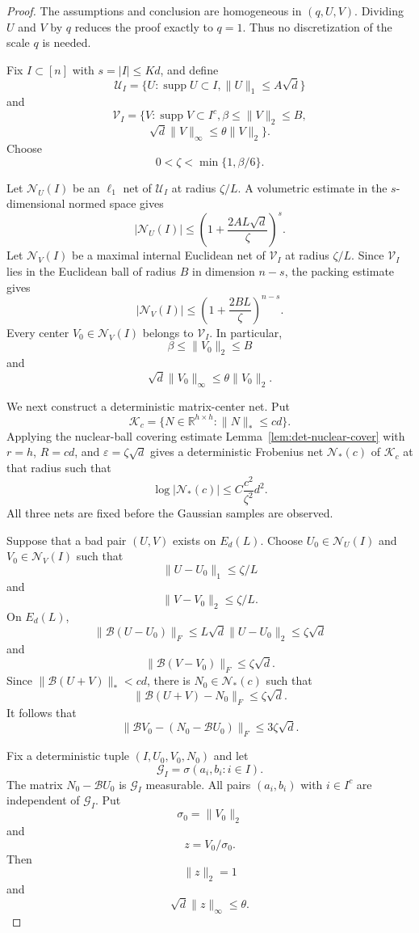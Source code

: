 \documentclass[11pt]{article}
\numberwithin{equation}{section}
\theoremstyle{definition}
\theoremstyle{remark}
\newcommand{\R}{\mathbb R}
\newcommand{\1}{\boldsymbol 1}
\newcommand{\cB}{\mathcal B}
\newcommand{\supp}{\operatorname{supp}}
\begin{document}
\begin{aiblock}
\begin{proof}
  The assumptions and conclusion are homogeneous in
  $(q,U,V)$. Dividing $U$ and $V$ by $q$ reduces the
  proof exactly to $q=1$. Thus no discretization of the
  scale $q$ is needed.

  Fix $I\subset[n]$ with $s=|I|\le Kd$, and define
  \[
    \mathcal U_I=\{U:\supp U\subset I,\|U\|_1\le
    A\sqrt d\}
  \]
  and
  \[
    \mathcal V_I=\{V:\supp V\subset I^c,\beta\le
    \|V\|_2\le B,
  \]
  \[
    \sqrt d\|V\|_\infty\le\theta\|V\|_2\}.
  \]
  Choose
  \[
    0<\zeta<\min\{1,\beta/6\}.
  \]

  Let $\mathcal N_U(I)$ be an $\ell_1$ net of
  $\mathcal U_I$ at radius $\zeta/L$. A volumetric
  estimate in the $s$-dimensional normed space gives
  \[
    |\mathcal N_U(I)| \le
    \left(1+\frac{2AL\sqrt d}{\zeta}\right)^s.
  \]
  Let $\mathcal N_V(I)$ be a maximal internal Euclidean
  net of $\mathcal V_I$ at radius $\zeta/L$. Since
  $\mathcal V_I$ lies in the Euclidean ball of radius
  $B$ in dimension $n-s$, the packing estimate gives
  \[
    |\mathcal N_V(I)| \le
    \left(1+\frac{2BL}{\zeta}\right)^{n-s}.
  \]
  Every center $V_0\in\mathcal N_V(I)$ belongs to
  $\mathcal V_I$. In particular,
  \[
    \beta\le\|V_0\|_2\le B
  \]
  and
  \[
    \sqrt d\|V_0\|_\infty\le\theta\|V_0\|_2.
  \]

  We next construct a deterministic matrix-center net.
  Put
  \[
    \mathcal K_c=\{N\in\R^{h\times h}:\|N\|_*\le cd\}.
  \]
  Applying the nuclear-ball covering estimate
  Lemma~\ref{lem:det-nuclear-cover} with $r=h$, $R=cd$, and
  $\varepsilon=\zeta\sqrt d$ gives a deterministic
  Frobenius net $\mathcal N_*(c)$ of $\mathcal K_c$ at
  that radius such that
  \[
    \log|\mathcal N_*(c)| \le
    C\frac{c^2}{\zeta^2}d^2.
  \]
  All three nets are fixed before the Gaussian samples
  are observed.

  Suppose that a bad pair $(U,V)$ exists on $E_d(L)$.
  Choose $U_0\in\mathcal N_U(I)$ and
  $V_0\in\mathcal N_V(I)$ such that
  \[
    \|U-U_0\|_1\le\zeta/L
  \]
  and
  \[
    \|V-V_0\|_2\le\zeta/L.
  \]
  On $E_d(L)$,
  \[
    \|\cB(U-U_0)\|_F \le L\sqrt d\|U-U_0\|_2
    \le\zeta\sqrt d
  \]
  and
  \[
    \|\cB(V-V_0)\|_F\le\zeta\sqrt d.
  \]
  Since $\|\cB(U+V)\|_*<cd$, there is
  $N_0\in\mathcal N_*(c)$ such that
  \[
    \|\cB(U+V)-N_0\|_F\le\zeta\sqrt d.
  \]
  It follows that
  \[
    \|\cB V_0-(N_0-\cB U_0)\|_F\le3\zeta\sqrt d.
  \]

  Fix a deterministic tuple $(I,U_0,V_0,N_0)$ and let
  \[
    \mathcal G_I=\sigma(a_i,b_i:i\in I).
  \]
  The matrix $N_0-\cB U_0$ is $\mathcal G_I$ measurable.
  All pairs $(a_i,b_i)$ with $i\in I^c$ are independent
  of $\mathcal G_I$. Put
  \[
    \sigma_0=\|V_0\|_2
  \]
  and
  \[
    z=V_0/\sigma_0.
  \]
  Then
  \[
    \|z\|_2=1
  \]
  and
  \[
    \sqrt d\|z\|_\infty\le\theta.
  \]


\end{proof}
\end{aiblock}
\end{document}
